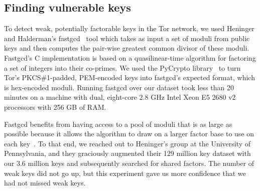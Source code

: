 \subsection{Finding vulnerable keys}
\label{sec:vulnerable-keys}
To detect weak, potentially factorable keys in the Tor network, we used Heninger
and Halderman's fastgcd~\cite{fastgcd} tool which takes as input a set
of moduli from public keys and then computes the pair-wise greatest common
divisor of these moduli.  Fastgcd's C implementation is based on a
quasilinear-time algorithm for factoring a set of integers into their co-primes.
We used the PyCrypto library~\cite{pycrypto} to turn Tor's PKCS\#1-padded,
PEM-encoded keys into fastgcd's expected format, which is hex-encoded
moduli.  Running fastgcd over our dataset took less than 20 minutes on
a machine with dual, eight-core 2.8 GHz Intel Xeon E5 2680 v2 processors with
256 GB of RAM.

Fastgcd benefits from having access to a pool of moduli that is as large as possible
because it allows the algorithm to draw on a larger factor base to use on each
key~\cite{Heninger2012a}.  To that end, we reached out to Heninger's group at
the University of Pennsylvania, and they graciously augmented their 129 million
key dataset with our 3.6 million keys and subsequently searched for shared
factors.  The number of weak keys did not go up, but this experiment gave us
more confidence that we had not missed weak keys.
